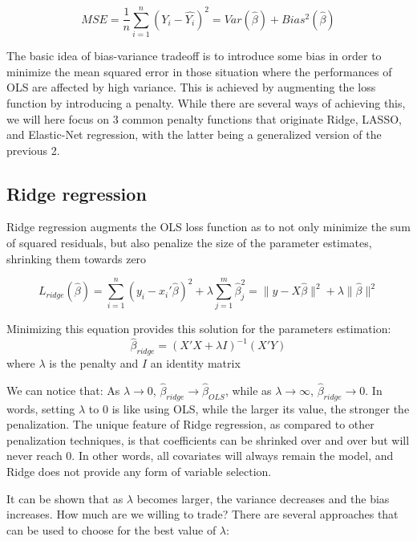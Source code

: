 \documentclass[
]{book}
\begin{document}
\[MSE=\frac{1}{n}\sum_{i=1}^n(Y_i-\hat{Y_i})^2=Var(\hat{\beta})+Bias^2(\hat{\beta})\]

The basic idea of bias-variance tradeoff is to introduce some bias in order to minimize the mean squared error in those situation where the performances of OLS are affected by high variance. This is achieved by augmenting the loss function by introducing a penalty. While there are several ways of achieving this, we will here focus on 3 common penalty functions that originate Ridge, LASSO, and Elastic-Net regression, with the latter being a generalized version of the previous 2.

\hypertarget{ridge-regression}{%
\subsection{Ridge regression}\label{ridge-regression}}

Ridge regression augments the OLS loss function as to not only minimize the sum of squared residuals, but also penalize the size of the parameter estimates, shrinking them towards zero

\[L_{ridge}(\hat{\beta})=\sum_{i=1}^n(y_i-x_i'\hat{\beta})^2+\lambda\sum_{j=1}^m\hat{\beta}_j^2=\|y-X\hat{\beta}\|^2+\lambda\|\hat{\beta}\|^2\]

Minimizing this equation provides this solution for the parameters estimation:
\[\hat{\beta}_{ridge}=(X'X+\lambda I)^{-1}(X'Y)\]
where \(\lambda\) is the penalty and \(I\) an identity matrix

We can notice that: As \(\lambda\rightarrow 0\), \(\hat{\beta}_{ridge}\rightarrow\hat{\beta}_{OLS}\), while as \(\lambda\rightarrow \infty\), \(\hat{\beta}_{ridge}\rightarrow 0\). In words, setting \(\lambda\) to 0 is like using OLS, while the larger its value, the stronger the penalization. The unique feature of Ridge regression, as compared to other penalization techniques, is that coefficients can be shrinked over and over but will never reach 0. In other words, all covariates will always remain the model, and Ridge does not provide any form of variable selection.

It can be shown that as \(\lambda\) becomes larger, the variance decreases and the bias increases. How much are we willing to trade?
There are several approaches that can be used to choose for the best value of \(\lambda\):
\end{document}
